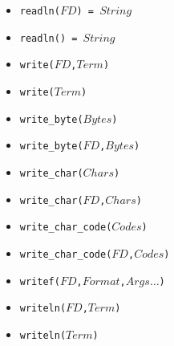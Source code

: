 \documentclass[10pt]{article}
\newcommand{\ignore}[1]{}
\begin{document}
\begin{multicols}{2}
\begin{scriptsize}
\begin{itemize}
   \item \texttt{readln($FD$) = $String$}
   \item \texttt{readln() = $String$}
   \item \texttt{write($FD$,$Term$)}
   \item \texttt{write($Term$)}
   \item \texttt{write\_byte($Bytes$)}
   \item \texttt{write\_byte($FD$,$Bytes$)}
   \item \texttt{write\_char($Chars$)}
   \item \texttt{write\_char($FD$,$Chars$)}
   \item \texttt{write\_char\_code($Codes$)}
   \item \texttt{write\_char\_code($FD$,$Codes$)}
   \item \texttt{writef($FD$,$Format$,$Args\ldots$)}
   \item \texttt{writeln($FD$,$Term$)}
   \item \texttt{writeln($Term$)}
\ignore{
   \item \texttt{peek\_int($FD$) = $Int$}
   \item \texttt{peek\_real($FD$) = $Real$}
   \item \texttt{getpos($FD$) = $Pos$}
   \item \texttt{mkfifo($Path$)}
   \item \texttt{mkfifo($Path$,$Mode$)}
   \item \texttt{mkpipe() = $FD\_Map$}
   \item \texttt{mktmp() = $FD$}
   \item \texttt{peek\_unicode\_char($FD$) = $Val$}
   \item \texttt{rewind($FD$)}
   \item \texttt{seek($FD$,$Offset$,$From$)}
   \item \texttt{setpos($FD$,$Pos$)}
   \item \texttt{sizeof\_char() = $Size$}
   \item \texttt{stderr}
   \item \texttt{stdin}
   \item \texttt{stdout}
}
\end{itemize}
\end{scriptsize}

\end{multicols}
\end{document}
